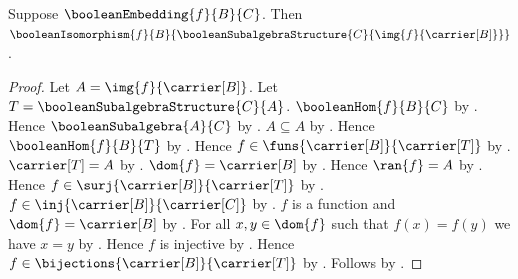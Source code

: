 \begin{theorem}\label{boolean_embedding_image_isomorphism}
    Suppose $\booleanEmbedding{f}{B}{C}$.
    Then
        $\booleanIsomorphism
            {f}
            {B}
            {\booleanSubalgebraStructure
                {C}{\img{f}{\carrier[B]}}}$.
\end{theorem}
\begin{proof}
    Let $A=\img{f}{\carrier[B]}$.
    Let $T=\booleanSubalgebraStructure{C}{A}$.
    $\booleanHom{f}{B}{C}$ by .
    Hence $\booleanSubalgebra{A}{C}$ by
        .
    $A\subseteq A$ by .
    Hence $\booleanHom{f}{B}{T}$ by
        .
    Hence $f\in\funs{\carrier[B]}{\carrier[T]}$ by
        .
    $\carrier[T]=A$ by
        .
    $\dom{f}=\carrier[B]$ by .
    Hence $\ran{f}=A$ by .
    Hence $f\in\surj{\carrier[B]}{\carrier[T]}$ by
        .
    $f\in\inj{\carrier[B]}{\carrier[C]}$ by
        .
    $f$ is a function and $\dom{f}=\carrier[B]$ by
        .
    For all $x,y\in\dom{f}$ such that $f(x)=f(y)$ we have
        $x=y$ by .
    Hence $f$ is injective by .
    Hence $f\in\bijections{\carrier[B]}{\carrier[T]}$ by
        .
    Follows by .
\end{proof}
